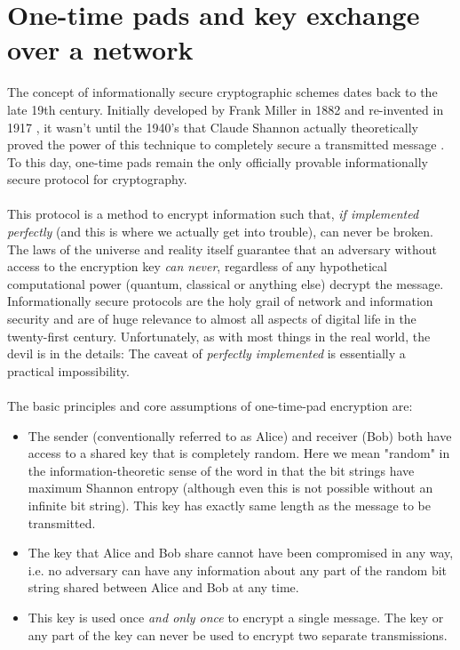 \documentclass[aps,prl,twocolumn,10pt,nofootinbib]{revtex4}
\begin{document}
\section{One-time pads and key exchange over a network}
The concept of informationally secure cryptographic schemes dates back to the late 19th century.  Initially developed by Frank Miller in 1882 \cite{?} and re-invented in 1917 \cite{?}, it wasn't until the 1940's that Claude Shannon actually theoretically proved the power of this technique to completely secure a transmitted message \cite{?}.  To this day, one-time pads remain the only officially provable informationally secure protocol for cryptography.  
\\
\\
This protocol is a method to encrypt information such that, {\em if implemented perfectly} (and this is where we actually get into trouble), can never be broken.  The laws of the universe and reality itself guarantee that an adversary without access to the encryption key {\em can never}, regardless of any hypothetical computational power (quantum, classical or anything else) decrypt the message. Informationally secure protocols are the holy grail of network and information security and are of huge relevance to almost all aspects of digital life in the twenty-first century. Unfortunately, as with most things in the real world, the devil is in the details: The caveat of {\em perfectly implemented} is essentially a practical impossibility.  
\\
\\
The basic principles and core assumptions of one-time-pad encryption are:
\begin{itemize}
\item The sender (conventionally referred to as Alice) and receiver (Bob) both have access to a shared key that is completely random. Here we mean "random" in the information-theoretic sense of the word in that the bit strings have maximum Shannon entropy (although even this is not possible without an infinite bit string). This key has exactly same length as the message to be transmitted.
\item The key that Alice and Bob share cannot have been compromised in any way,  i.e. no adversary can have any information about any part of the random bit string shared between Alice and Bob at any time.
\item This key is used once {\em and only once} to encrypt a single message.  The key or any part of the key can never be used to encrypt two separate transmissions.
\end{itemize}
\end{document}
